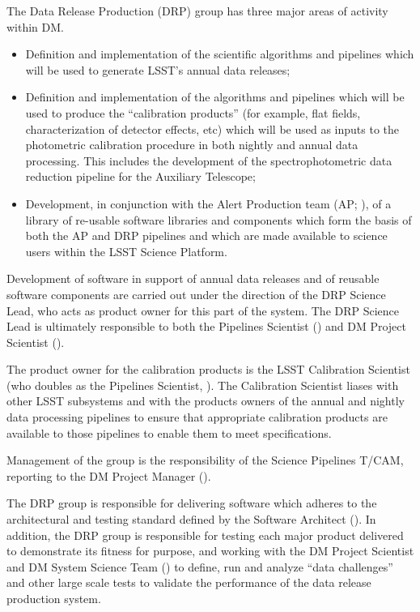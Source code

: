 The Data Release Production (DRP) group has three major areas of activity within DM.

\begin{itemize}

  \item{Definition and implementation of the scientific algorithms and pipelines which will be used to generate LSST's annual data releases;}

  \item{Definition and implementation of the algorithms and pipelines which will be used to produce the ``calibration products'' (for example, flat fields, characterization of detector effects, etc) which will be used as inputs to the photometric calibration procedure in both nightly and annual data processing. This includes the development of the spectrophotometric data reduction pipeline for the Auxiliary Telescope;}

  \item{Development, in conjunction with the Alert Production team (AP; ), of a library of re-usable software libraries and components which form the basis of both the AP and DRP pipelines and which are made available to science users within the LSST Science Platform.}

\end{itemize}

Development of software in support of annual data releases and of reusable software components are carried out under the direction of the DRP Science Lead, who acts as product owner for this part of the system.
The DRP Science Lead is ultimately responsible to both the Pipelines Scientist () and DM Project Scientist ().

The product owner for the calibration products is the LSST Calibration Scientist (who doubles as the Pipelines Scientist, ).
The Calibration Scientist liases with other LSST subsystems and with the products owners of the annual and nightly data processing pipelines to ensure that appropriate calibration products are available to those pipelines to enable them to meet specifications.

Management of the group is the responsibility of the Science Pipelines T/CAM, reporting to the DM Project Manager ().

The DRP group is responsible for delivering software which adheres to the architectural and testing standard defined by the Software Architect ().
In addition, the DRP group is responsible for testing each major product delivered to demonstrate its fitness for purpose, and working with the DM Project Scientist and DM System Science Team () to define, run and analyze ``data challenges'' and other large scale tests to validate the performance of the data release production system.

